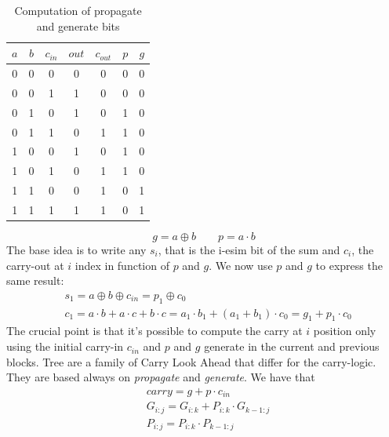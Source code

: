 \begin{itemize}
    \begin{table}[H]
        \begin{center}
            \begin{tabular}{ c c c | c c | c c}
                $a$ & $b$ & $c_{in}$ & $out$ & $c_{out}$ & $p$ & $g$ \\
                \hline
                0 & 0 & 0 & 0 & 0 & 0 & 0\\ 
                0 & 0 & 1 & 1 & 0 & 0 & 0\\ 
                0 & 1 & 0 & 1 & 0 & 1 & 0\\ 
                0 & 1 & 1 & 0 & 1 & 1 & 0\\ 
                1 & 0 & 0 & 1 & 0 & 1 & 0\\ 
                1 & 0 & 1 & 0 & 1 & 1 & 0\\ 
                1 & 1 & 0 & 0 & 1 & 0 & 1\\ 
                1 & 1 & 1 & 1 & 1 & 0 & 1\\ 
            \end{tabular}
            \caption{Computation of propagate and generate bits}
        \end{center}
    \end{table}
    \begin{equation} \label{eq:pandg}
        g = a \oplus b \quad\quad p = a \cdot b
    \end{equation}
    The base idea is to write any $s_i$, that is the i-esim bit of the sum and $c_i$, the carry-out at $i$ index in function of $p$ and $g$.
    We now use $p$ and $g$ to express the same result:
    \begin{align*}
        & s_1 = a \oplus b \oplus c_{in} = p_1 \oplus c_0\\
        & c_1 = a \cdot b + a \cdot c + b \cdot c = a_1 \cdot b_1 + (a_1 + b_1) \cdot c_0 =  g_1 + p_1 \cdot c_0
    \end{align*}
    The crucial point is that it's possible to compute the carry at $i$ position only using the initial carry-in $c_{in}$ and $p$ and $g$ generate in the current and previous blocks. Tree are a family of Carry Look Ahead that differ for the carry-logic. They are based always on \textit{propagate} and \textit{generate}. We have that   
    \begin{align*}
        & carry = g + p \cdot c_{in}\\
        & G_{i:j} = G_{i:k} + P_{i:k} \cdot G_{k-1:j}\\
        & P_{i:j} = P_{i:k} \cdot P_{k-1:j}

\end{align*}
\end{itemize}
